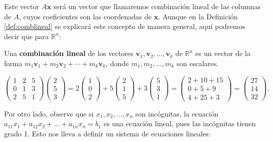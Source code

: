 Este vector $A\mathbf{x}$ será un vector que llamaremos combinación lineal de las columnas de $A$, cuyos coeficientes son las coordenadas de $\mathbf{x}$. Aunque en la Definición \ref{def:comblineal} se explicará este concepto de manera general, aquí podremos decir que para $\mathbb{R}^n$:

\begin{definition}
Una \textbf{combinación lineal} de los vectores $\mathbf{v}_1,\mathbf{v}_2,\ldots, \mathbf{v}_k$ de $\mathbb{R}^n$ es un vector de la forma $m_1\mathbf{v}_1+m_2\mathbf{v}_2+\cdots + m_k\mathbf{v}_k$, donde $m_1, m_2,\ldots, m_k$ son escalares.
\end{definition} 

\begin{example}
$\begin{pmatrix} 1&2&5\\0&1&3\\2&5&1 \end{pmatrix}\begin{pmatrix} 2\\5\\3 \end{pmatrix} = 2\begin{pmatrix}1\\0\\2 \end{pmatrix}+5\begin{pmatrix} 2\\1\\5\end{pmatrix}+3\begin{pmatrix} 5\\3\\1\end{pmatrix}= \begin{pmatrix} 2+10+15\\0+5+9\\4+25+3 \end{pmatrix}= \begin{pmatrix} 27\\14\\32 \end{pmatrix}.$
\end{example}

Por otro lado, observe que si $x_1,x_2,\dots, x_n$ son incógnitas, la ecuación $a_{11}x_1+a_{12}x_2+\dots + a_{1n}x_n=b_1$ es una ecuación lineal, pues las incógnitas tienen grado 1. Esto nos lleva a definir un sistema de ecuaciones lineales:

